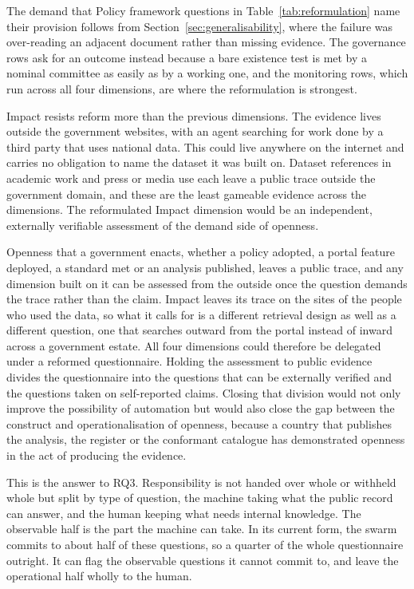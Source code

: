 The demand that Policy framework questions in Table~\ref{tab:reformulation} name their provision follows from Section~\ref{sec:generalisability}, where the failure was over-reading an adjacent document rather than missing evidence. The governance rows ask for an outcome instead because a bare existence test is met by a nominal committee as easily as by a working one, and the monitoring rows, which run across all four dimensions, are where the reformulation is strongest.

Impact resists reform more than the previous dimensions. The evidence lives outside the government websites, with an agent searching for work done by a third party that uses national data. This could live anywhere on the internet and carries no obligation to name the dataset it was built on. Dataset references in academic work and press or media use each leave a public trace outside the government domain, and these are the least gameable evidence across the dimensions. The reformulated Impact dimension would be an independent, externally verifiable assessment of the demand side of openness.

Openness that a government enacts, whether a policy adopted, a portal feature deployed, a standard met or an analysis published, leaves a public trace, and any dimension built on it can be assessed from the outside once the question demands the trace rather than the claim. Impact leaves its trace on the sites of the people who used the data, so what it calls for is a different retrieval design as well as a different question, one that searches outward from the portal instead of inward across a government estate. All four dimensions could therefore be delegated under a reformed questionnaire. Holding the assessment to public evidence divides the questionnaire into the questions that can be externally verified and the questions taken on self-reported claims. Closing that division would not only improve the possibility of automation but would also close the gap between the construct and operationalisation of openness, because a country that publishes the analysis, the register or the conformant catalogue has demonstrated openness in the act of producing the evidence.

This is the answer to RQ3. Responsibility is not handed over whole or withheld whole but split by type of question, the machine taking what the public record can answer, and the human keeping what needs internal knowledge. The observable half is the part the machine can take. In its current form, the swarm commits to about half of these questions, so a quarter of the whole questionnaire outright. It can flag the observable questions it cannot commit to, and leave the operational half wholly to the human.

